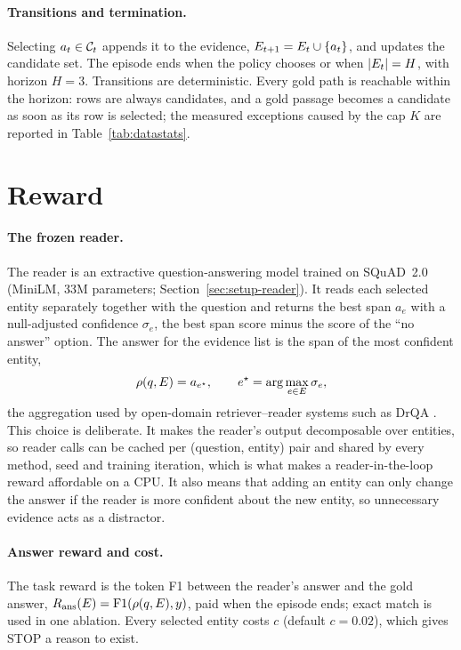 \paragraph{Transitions and termination.} Selecting $a_t\in\mathcal{C}_t$ appends it to the evidence, $E_{t+1}=E_t\cup\{a_t\}$, and updates the candidate set. The episode ends when the policy chooses \STOP{} or when $|E_t|=H$, with horizon $H=3$. Transitions are deterministic. Every gold path is reachable within the horizon: rows are always candidates, and a gold passage becomes a candidate as soon as its row is selected; the measured exceptions caused by the cap $K$ are reported in Table~\ref{tab:datastats}.

\section{Reward}
\label{sec:reward}

\paragraph{The frozen reader.} The reader is an extractive question-answering model trained on SQuAD~2.0 \citep{rajpurkar-etal-2018-know} (MiniLM, 33M parameters; Section~\ref{sec:setup-reader}). It reads each selected entity separately together with the question and returns the best span $a_e$ with a null-adjusted confidence $\sigma_e$, the best span score minus the score of the ``no answer'' option. The answer for the evidence list is the span of the most confident entity,
\begin{equation}
  \rho(q,E)=a_{e^\star},\qquad e^\star=\arg\max_{e\in E}\sigma_e ,
\end{equation}
the aggregation used by open-domain retriever--reader systems such as DrQA \citep{chen-etal-2017-reading}. This choice is deliberate. It makes the reader's output decomposable over entities, so reader calls can be cached per (question, entity) pair and shared by every method, seed and training iteration, which is what makes a reader-in-the-loop reward affordable on a CPU. It also means that adding an entity can only change the answer if the reader is more confident about the new entity, so unnecessary evidence acts as a distractor.

\paragraph{Answer reward and cost.} The task reward is the token F1 between the reader's answer and the gold answer, $R_{\mathrm{ans}}(E)=\mathrm{F1}(\rho(q,E),y)$, paid when the episode ends; exact match is used in one ablation. Every selected entity costs $c$ (default $c=0.02$), which gives STOP a reason to exist.


